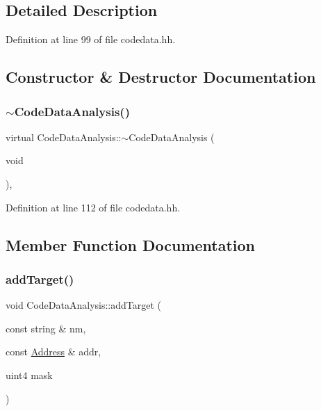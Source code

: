 \subsection{Detailed Description}


Definition at line 99 of file codedata.\+hh.



\subsection{Constructor \& Destructor Documentation}
\mbox{\label{class_code_data_analysis_aafb112248968cfe4a812d27b022703af}} 
\subsubsection{\texorpdfstring{$\sim$CodeDataAnalysis()}{~CodeDataAnalysis()}}
{\footnotesize\ttfamily virtual Code\+Data\+Analysis\+::$\sim$\+Code\+Data\+Analysis (\begin{DoxyParamCaption}\item[{void}]{ }\end{DoxyParamCaption})\hspace{0.3cm}{\ttfamily [inline]}, {\ttfamily [virtual]}}



Definition at line 112 of file codedata.\+hh.



\subsection{Member Function Documentation}
\mbox{\label{class_code_data_analysis_a67d42a5bdfb0801cb8ae03e4d8c5b021}} 
\subsubsection{\texorpdfstring{addTarget()}{addTarget()}}
{\footnotesize\ttfamily void Code\+Data\+Analysis\+::add\+Target (\begin{DoxyParamCaption}\item[{const string \&}]{nm,  }\item[{const \mbox{\hyperlink{class_address}{Address}} \&}]{addr,  }\item[{uint4}]{mask }\end{DoxyParamCaption})}



